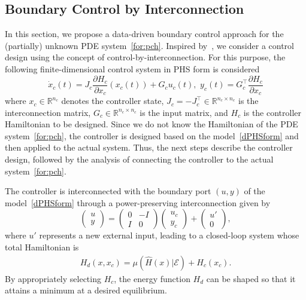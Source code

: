 \documentclass[letterpaper, 10 pt, conference]{ieeeconf}  %
\newcounter{part} %
\newcommand{\R}{\mathbb{R}}
\begin{document}
\subsection{Boundary Control by Interconnection}
In this section, we propose a data-driven boundary control approach for the (partially) unknown PDE system~\cref{for:pch}. Inspired by~\cite{macchelli2015control}, we consider a control design using the concept of control-by-interconnection. For this purpose, the following finite-dimensional control system in PHS form is considered
\begin{equation}
\dot{x}_c(t) = J_c \frac{\partial H_c}{\partial x_c}(x_c(t)) + G_c u_c(t), \,\,
y_c(t) = G_c^\top \frac{\partial H_c}{\partial x_c}
\label{eq:controller}
\end{equation}
where $x_c \in \mathbb{R}^{n_c}$ denotes the controller state, $J_c = -J_c^\top\in\R^{n_c\times n_c}$ is the interconnection matrix, $G_c\in\R^{n_c\times n_c}$ is the input matrix, and $H_c$ is the controller Hamiltonian to be designed. Since we do not know the Hamiltonian of the PDE system~\cref{for:pch}, the controller is designed based on the model~\cref{dPHSform} and then applied to the actual system. Thus, the next steps describe the controller design, followed by the analysis of connecting the controller to the actual system~\cref{for:pch}.

The controller is interconnected with the boundary port $(u,y)$ of the model~\cref{dPHSform} through a power-preserving interconnection given by
\begin{equation}
\begin{pmatrix}
u \\
y
\end{pmatrix}
=
\begin{pmatrix}
0 & -I \\
I & 0
\end{pmatrix}
\begin{pmatrix}
u_c \\
y_c
\end{pmatrix}
+
\begin{pmatrix}
u' \\
0
\end{pmatrix},
\label{eq:interconnection}
\end{equation}
where $u'$ represents a new external input, leading to a closed-loop system whose total Hamiltonian is
\begin{align}
H_d(x,x_c) = \mu(\hat{H}(x)|\mathcal{E}) + H_c(x_c).
\end{align}
By appropriately selecting $H_c$, the energy function $H_d$ can be shaped so that it attains a minimum at a desired equilibrium.
\end{document}
